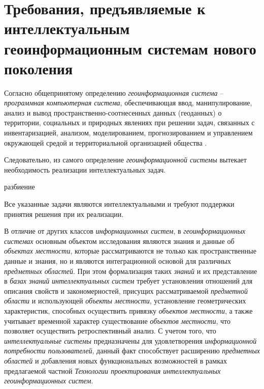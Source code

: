 \begin{SCn}
\end{SCn}

\section{Требования, предъявляемые к интеллектуальным геоинформационным системам нового поколения}
\label{chapter_gis_sec_requirements}

Согласно общепринятому определению \textit{геоинформационная система} -- \textit{программная компьютерная система}, обеспечивающая ввод, манипулирование, анализ и вывод пространственно-соотнесенных данных (геоданных) о территории, социальных и природных явлениях при решении задач, связанных с инвентаризацией, анализом, моделированием, прогнозированием и управлением окружающей средой и территориальной организацией общества .

Следовательно, из самого определение \textit{геоинформационной системы} вытекает необходимость реализации интеллектуальных задач.

\begin{SCn}
	
\begin{scnrelfromset}{разбиение}
\end{scnrelfromset}
	
\end{SCn}

Все указанные задачи являются интеллектуальными и требуют поддержки принятия решения при их реализации.

В отличие от других классов \textit{информационных систем}, в \textit{геоинформационных системах} основным объектом исследования являются знания и данные об \textit{объектах местности}, которые рассматриваются не только как пространственные данные и знания, но и являются интеграционной основой для различных \textit{предметных областей}. При этом формализация таких \textit{знаний} и их представление в \textit{базах знаний} \textit{интеллектуальных систем} требует установления отношений для описания свойств и закономерностей, присущих рассматриваемой \textit{предметной области} и использующей \textit{объекты местности}, установление геометрических характеристик, способных осуществить привязку \textit{объектов местности}, а также учитывает временной характер существование \textit{объектов местности}, что позволяет осуществить ретроспективный анализ. С учетом того, что \textit{интеллектуальные системы} предназначены для удовлетворения \textit{информационной потребности пользователей}, данный факт способствует расширению \textit{предметных областей} и добавления новых функциональных возможностей в рамках предлагаемой частной \textit{Технологии проектирования интеллектуальных геоинформационных систем}.

